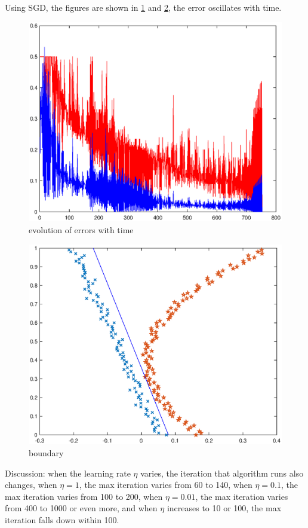\documentclass[a4paper,12pt]{article}
\begin{document}
Using SGD, the figures are shown in \ref{1-3} and \ref{1-4}, the error oscillates with time.

\begin{figure}[h]
\centering
\includegraphics[width = .8\textwidth]{figure/1_3.eps}
\caption{evolution of errors with time}
\label{1-3}
\end{figure}

\begin{figure}[h]
\centering
\includegraphics[width = .8\textwidth]{figure/1_4.eps}
\caption{boundary}
\label{1-4}
\end{figure}

Discussion: when the learning rate $\eta$ varies, the iteration that algorithm runs also changes, when $\eta = 1$, the max iteration varies from 60 to 140, when $\eta = 0.1$, the max iteration varies from 100 to 200, when $\eta = 0.01$, the max iteration varies from 400 to 1000 or even more, and when $\eta$ increases to 10 or 100, the max iteration falls down within 100. 
\end{document}
